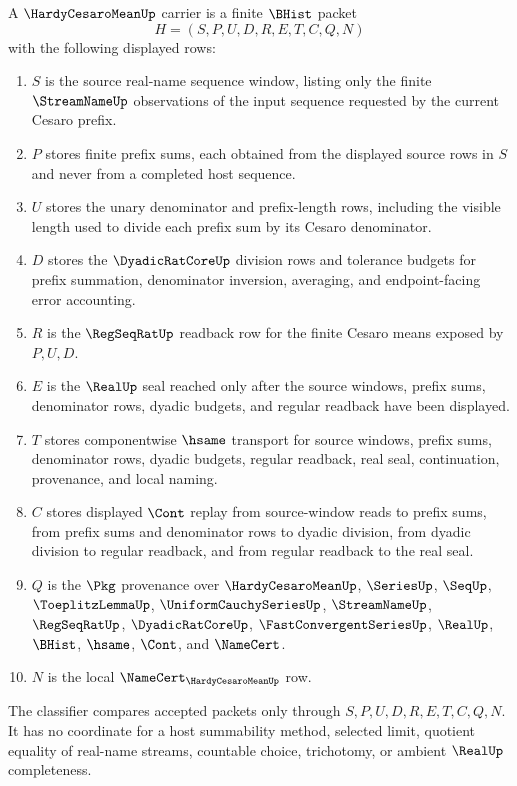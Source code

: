 \begin{definition}\label{def:hardy-cesaro-mean-carrier}
A $\HardyCesaroMeanUp$ carrier is a finite $\BHist$ packet
$$
H=(S,P,U,D,R,E,T,C,Q,N)
$$
with the following displayed rows:
\begin{enumerate}
\item $S$ is the source real-name sequence window, listing only the finite $\StreamNameUp$ observations of the input sequence requested by the current Cesaro prefix.
\item $P$ stores finite prefix sums, each obtained from the displayed source rows in $S$ and never from a completed host sequence.
\item $U$ stores the unary denominator and prefix-length rows, including the visible length used to divide each prefix sum by its Cesaro denominator.
\item $D$ stores the $\DyadicRatCoreUp$ division rows and tolerance budgets for prefix summation, denominator inversion, averaging, and endpoint-facing error accounting.
\item $R$ is the $\RegSeqRatUp$ readback row for the finite Cesaro means exposed by $P,U,D$.
\item $E$ is the $\RealUp$ seal reached only after the source windows, prefix sums, denominator rows, dyadic budgets, and regular readback have been displayed.
\item $T$ stores componentwise $\hsame$ transport for source windows, prefix sums, denominator rows, dyadic budgets, regular readback, real seal, continuation, provenance, and local naming.
\item $C$ stores displayed $\Cont$ replay from source-window reads to prefix sums, from prefix sums and denominator rows to dyadic division, from dyadic division to regular readback, and from regular readback to the real seal.
\item $Q$ is the $\Pkg$ provenance over $\HardyCesaroMeanUp$, $\SeriesUp$, $\SeqUp$, $\ToeplitzLemmaUp$, $\UniformCauchySeriesUp$, $\StreamNameUp$, $\RegSeqRatUp$, $\DyadicRatCoreUp$, $\FastConvergentSeriesUp$, $\RealUp$, $\BHist$, $\hsame$, $\Cont$, and $\NameCert$.
\item $N$ is the local $\NameCert_{\HardyCesaroMeanUp}$ row.
\end{enumerate}
The classifier compares accepted packets only through $S,P,U,D,R,E,T,C,Q,N$. It has no coordinate for a host summability method, selected limit, quotient equality of real-name streams, countable choice, trichotomy, or ambient $\RealUp$ completeness.
\end{definition}

